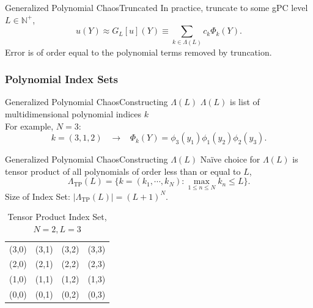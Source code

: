 \documentclass{beamer}
\begin{document}
\begin{frame}{Generalized Polynomial Chaos}{Truncated}\vspace{-20pt}
  In practice, truncate to some gPC level $L\in\mathbb{N^+}$,
  \begin{equation*}
    u(Y)\approx G_L[u](Y) \equiv \sum_{k\in\Lambda(L)} c_k \Phi_k(Y).
  \end{equation*}%
  Error is of order equal to the polynomial terms removed by truncation.
\end{frame}

\subsubsection{Polynomial Index Sets}
\begin{frame}{Generalized Polynomial Chaos}{Constructing $\Lambda(L)$}\vspace{-20pt}
  $\Lambda(L)$ is list of multidimensional polynomial indices $k$\vspace{25pt}\\
  For example, $N=3$:
  \begin{equation*}
    k = (3,1,2)\hspace{10pt}\to\hspace{10pt} \Phi_k(Y) = \phi_3(y_1)\phi_1(y_2)\phi_2(y_3).
  \end{equation*}
\end{frame}

\begin{frame}{Generalized Polynomial Chaos}{Constructing $\Lambda(L)$}%
  Na{\"i}ve choice for $\Lambda(L)$ is tensor product of all polynomials of order less than or equal to $L$,
  \begin{equation*}
      \Lambda_\text{TP}(L)=\Big\{k=(k_1,\cdots,k_N): \max_{1\leq n\leq N}k_n\leq L\Big\}.
  \end{equation*}
  Size of Index Set: $|\Lambda_\text{TP}(L)|=(L+1)^N$.
  \begin{table}[h]
    \centering
    \begin{tabular}{c c c c}
    (3,0) & (3,1) & (3,2) & (3,3) \\
    (2,0) & (2,1) & (2,2) & (2,3) \\
    (1,0) & (1,1) & (1,2) & (1,3) \\
    (0,0) & (0,1) & (0,2) & (0,3)
    \end{tabular}
    \caption{Tensor Product Index Set, $N=2,L=3$}
    \label{tab:TP}
  \end{table}
\end{frame}
\end{document}
